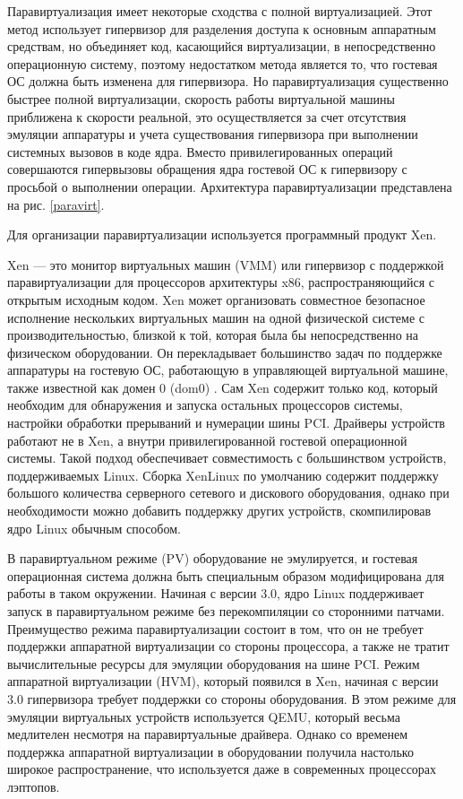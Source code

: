 Паравиртуализация имеет некоторые сходства с полной виртуализацией.
Этот метод использует гипервизор для разделения доступа к основным аппаратным средствам, но объединяет код, касающийся виртуализации, в непосредственно операционную систему, поэтому недостатком метода является то, что гостевая ОС должна быть изменена для гипервизора.
Но паравиртуализация существенно быстрее полной виртуализации, скорость работы виртуальной машины приближена к скорости реальной, это осуществляется за счет отсутствия эмуляции аппаратуры и учета существования гипервизора при выполнении системных вызовов в коде ядра.
Вместо привилегированных операций совершаются гипервызовы обращения ядра гостевой ОС к гипервизору с просьбой о выполнении операции.
Архитектура паравиртуализации представлена на рис. \ref{paravirt}.

Для организации паравиртуализации используется программный продукт Xen.

Xen --- это монитор виртуальных машин (VMM) или гипервизор с поддержкой паравиртуализации для процессоров архитектуры x86, распространяющийся с открытым исходным кодом.
Xen может организовать совместное безопасное исполнение нескольких виртуальных машин на одной физической системе с производительностью, близкой к той, которая была бы непосредственно на физическом оборудовании.
Он перекладывает большинство задач по поддержке аппаратуры на гостевую ОС, работающую в управляющей виртуальной машине, также известной как домен 0 (dom0) \cite{xen-xguru}.
Сам Xen содержит только код, который необходим для обнаружения и запуска остальных процессоров системы, настройки обработки прерываний и нумерации шины PCI.
Драйверы устройств работают не в Xen, а внутри привилегированной гостевой операционной системы.
Такой подход обеспечивает совместимость с большинством устройств, поддерживаемых Linux.
Сборка XenLinux по умолчанию содержит поддержку большого количества серверного сетевого и дискового оборудования, однако при необходимости можно добавить поддержку других устройств, скомпилировав ядро Linux обычным способом.

В паравиртуальном режиме (PV) оборудование не эмулируется, и гостевая операционная система должна быть специальным образом модифицирована для работы в таком окружении.
Начиная с версии 3.0, ядро Linux поддерживает запуск в паравиртуальном режиме без перекомпиляции со сторонними патчами.
Преимущество режима паравиртуализации состоит в том, что он не требует поддержки аппаратной виртуализации со стороны процессора, а также не тратит вычислительные ресурсы для эмуляции оборудования на шине PCI.
Режим аппаратной виртуализации (HVM), который появился в Xen, начиная с версии 3.0 гипервизора требует поддержки со стороны оборудования.
В этом режиме для эмуляции виртуальных устройств используется QEMU, который весьма медлителен несмотря на паравиртуальные драйвера.
Однако со временем поддержка аппаратной виртуализации в оборудовании получила настолько широкое распространение, что используется даже в современных процессорах лэптопов.

